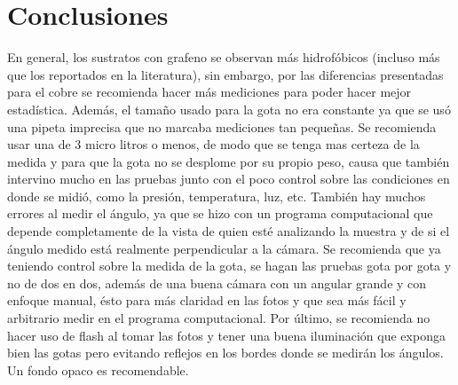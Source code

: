 \documentclass[twocolumn,letterpaper,aps,pra,10pt]{revtex4-1}
\begin{document}
\section{Conclusiones}
En general, los sustratos con grafeno se observan más hidrofóbicos (incluso más que los reportados en la literatura), sin embargo, por las diferencias presentadas para el cobre se recomienda hacer más mediciones para poder hacer mejor estadística. Además, el tamaño usado para la gota no era constante ya que se usó una pipeta imprecisa que no marcaba mediciones tan pequeñas. Se recomienda usar una de 3 micro litros o menos, de modo que se tenga mas certeza de la medida y para que la gota no se desplome por su propio peso, causa que también intervino mucho en las pruebas junto con el poco control sobre las condiciones en donde se midió, como la presión, temperatura, luz, etc. También hay muchos errores al medir el ángulo, ya que se hizo con un programa computacional que depende completamente de la vista de quien esté analizando la muestra y de si el ángulo medido está realmente perpendicular a la cámara. Se recomienda que ya teniendo control sobre la medida de la gota, se hagan las pruebas gota por gota y no de dos en dos, además de una buena cámara con un angular grande y con enfoque manual, ésto para más claridad en las fotos y que sea más fácil y arbitrario medir en el programa computacional. Por último, se recomienda no hacer uso de flash al tomar las fotos y tener una buena iluminación que exponga bien las gotas pero evitando reflejos en los bordes donde se medirán los ángulos. Un fondo opaco es recomendable. 
\end{document}

